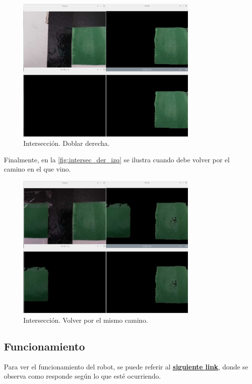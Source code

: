 \documentclass[11pt,a4paper]{article}
\begin{document}
	\begin{figure}[h!]
		\centering
		\includegraphics[width=0.8\textwidth]{imagenes/intersec_der}
		\caption{Intersección. Doblar derecha.}
		\label{fig:intersecder}
	\end{figure}
	
	Finalmente, en la \autoref*{fig:intersec_der_izq} se ilustra cuando debe volver por el camino en el que vino.
	
	\begin{figure}[h!]
		\centering
		\includegraphics[width=0.8\textwidth]{imagenes/intersec_der_izq}
		\caption{Intersección. Volver por el mismo camino.}
		\label{fig:intersec_der_izq}
	\end{figure}
	
	\subsection{Funcionamiento}
	Para ver el funcionamiento del robot, se puede referir al \href{https://youtu.be/b_Jz3BW02sM}{\underline{\textbf{siguiente link}}}, donde se observa como responde según lo que esté ocurriendo. 
	
\end{document}
